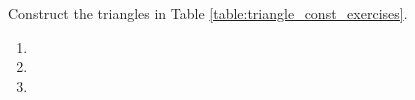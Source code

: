 


\item Construct the  triangles in Table \ref{table:triangle_const_exercises}.
\begin{table}[!ht]
\centering

\caption{}
\label{table:triangle_const_exercises}
\end{table}
\solution
\begin{enumerate}
    \item
    \item 
    \solution
    
    \item 
    \solution
    
        
\end{enumerate}
%
